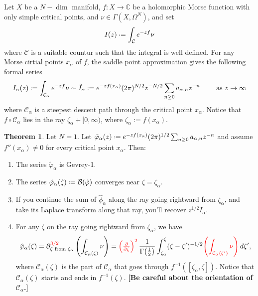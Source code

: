 \documentclass{article}
\theoremstyle{definition}
\newcommand{\C}{\mathbb{C}}
\newcommand*{\defeq}{\mathrel{\vcenter{\baselineskip0.5ex \lineskiplimit0pt
                     \hbox{\scriptsize.}\hbox{\scriptsize.}}}%
                     =}
\newcommand{\borel}{\mathcal{B}}
\newtheorem{theorem}{Theorem}[section]
\begin{document}
Let $X$ be a $N-\dim$ manifold, $f\colon X\to\C$ be a holomorphic Morse function with only simple critical points, and $\nu\in\Gamma(X,\Omega^N)$, and set
\begin{equation}\label{exp-int}
I(z)\defeq\int_{\mathcal{C}}e^{-zf}\nu
\end{equation}
where $\mathcal{C}$ is a suitable countur such that the integral is well defined.  
For any Morse cirtial points $x_\alpha$ of $f$, the saddle point approximation gives the following formal series 
\begin{equation}
I_{\alpha}(z)\defeq\int_{\mathcal{C}_\alpha}e^{-zf}\nu\sim \tilde{I}_{\alpha}\defeq e^{-zf(x_\alpha)}(2\pi)^{N/2} z^{-N/2}\sum_{n\geq 0}a_{\alpha,n}z^{-n} \qquad \text{ as } z\to\infty
\end{equation}
where $\mathcal{C}_\alpha$ is a steepest descent path through the critical point $x_\alpha$. Notice that $f \circ \mathcal{C}_\alpha$ lies in the ray $\zeta_\alpha +[0, \infty)$, where $\zeta_\alpha := f(x_\alpha)$.
\begin{theorem}\label{thm:maxim} Let $N=1$. Let $\tilde{\varphi}_{\alpha}(z)\defeq e^{-zf(x_\alpha)}(2\pi)^{1/2} \sum_{n\geq 0}a_{\alpha,n}z^{-n}$ and assume $f''(x_\alpha)\neq 0$ for every critical point $x_\alpha$. Then:
\begin{enumerate}
\item\label{int:series-gevrey} The series $\tilde{\varphi}_\alpha$ is Gevrey-1.
\item\label{int:resum-converges} The series $\hat{\varphi}_\alpha(\zeta)\defeq\borel(\tilde{\varphi})$ converges near $\zeta=\zeta_{\alpha}$.
\item\label{int:resum-valid} If you continue the sum of $\hat{\phi}_\alpha$ along the ray going rightward from $\zeta_\alpha$, and take its Laplace transform along that ray, you'll recover $z^{1/2} I_\alpha$.
\item\label{int:deriv-formula} For any $\zeta$ on the ray going rightward from $\zeta_\alpha$, we have
\begin{multline}\label{formula1}
\hat{\varphi}_{\alpha}(\zeta)=\partial^{\textcolor{red}{3/2}}_{\zeta \text{ from }\zeta_\alpha} \left( \int_{\mathcal{C}_\alpha(\zeta)}\nu \right)=\textcolor{red}{\left(\tfrac{\partial}{\partial \zeta}\right)^2}\,\frac{1}{\Gamma\big(\tfrac{1}{2}\big)} \int_{\zeta_\alpha}^\zeta (\zeta-\zeta')^{-1/2} \textcolor{red}{\left( \int_{\mathcal{C}_\alpha(\zeta')} \nu \right)}\,d\zeta',
\end{multline}
where $\mathcal{C}_\alpha(\zeta)$ is the part of $\mathcal{C}_\alpha$ that goes through $f^{-1}([\zeta_\alpha, \zeta])$. Notice that $\mathcal{C}_\alpha(\zeta)$ starts and ends in $f^{-1}(\zeta)$. \textbf{[Be careful about the orientation of $\mathcal{C}_\alpha$.]}
\end{enumerate}
\end{theorem}
\end{document}
